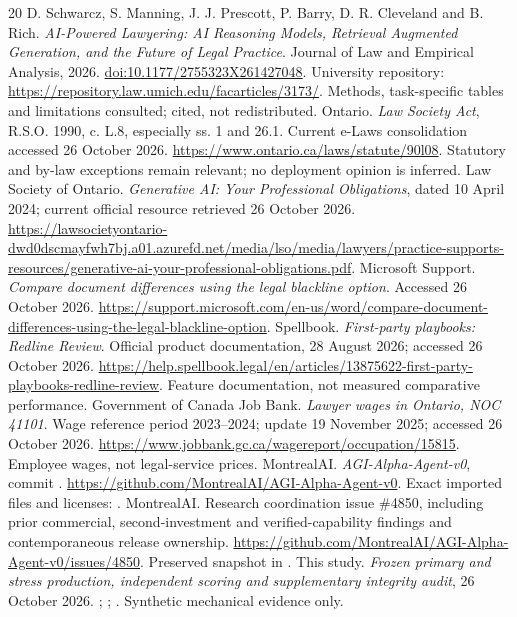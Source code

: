 \documentclass[10pt,a4paper]{article}
\begin{document}
\begin{thebibliography}{20}\small
{} D. Schwarcz, S. Manning, J. J. Prescott, P. Barry, D. R. Cleveland and B. Rich. \emph{AI-Powered Lawyering: AI Reasoning Models, Retrieval Augmented Generation, and the Future of Legal Practice}. Journal of Law and Empirical Analysis, 2026. \href{https://doi.org/10.1177/2755323X261427048}{doi:10.1177/2755323X261427048}. University repository: \url{https://repository.law.umich.edu/facarticles/3173/}. Methods, task-specific tables and limitations consulted; cited, not redistributed.
 Ontario. \emph{Law Society Act}, R.S.O. 1990, c. L.8, especially ss. 1 and 26.1. Current e-Laws consolidation accessed 26 October 2026. \url{https://www.ontario.ca/laws/statute/90l08}. Statutory and by-law exceptions remain relevant; no deployment opinion is inferred.
 Law Society of Ontario. \emph{Generative AI: Your Professional Obligations}, dated 10 April 2024; current official resource retrieved 26 October 2026. \url{https://lawsocietyontario-dwd0dscmayfwh7bj.a01.azurefd.net/media/lso/media/lawyers/practice-supports-resources/generative-ai-your-professional-obligations.pdf}.
 Microsoft Support. \emph{Compare document differences using the legal blackline option}. Accessed 26 October 2026. \url{https://support.microsoft.com/en-us/word/compare-document-differences-using-the-legal-blackline-option}.
 Spellbook. \emph{First-party playbooks: Redline Review}. Official product documentation, 28 August 2026; accessed 26 October 2026. \url{https://help.spellbook.legal/en/articles/13875622-first-party-playbooks-redline-review}. Feature documentation, not measured comparative performance.
 Government of Canada Job Bank. \emph{Lawyer wages in Ontario, NOC 41101}. Wage reference period 2023--2024; update 19 November 2025; accessed 26 October 2026. \url{https://www.jobbank.gc.ca/wagereport/occupation/15815}. Employee wages, not legal-service prices.
 MontrealAI. \emph{AGI-Alpha-Agent-v0}, commit . \url{https://github.com/MontrealAI/AGI-Alpha-Agent-v0}. Exact imported files and licenses: .
 MontrealAI. Research coordination issue \#4850, including prior commercial, second-investment and verified-capability findings and contemporaneous release ownership. \url{https://github.com/MontrealAI/AGI-Alpha-Agent-v0/issues/4850}. Preserved snapshot in .
 This study. \emph{Frozen primary and stress production, independent scoring and supplementary integrity audit}, 26 October 2026. ; ; . Synthetic mechanical evidence only.

\end{thebibliography}
\end{document}
